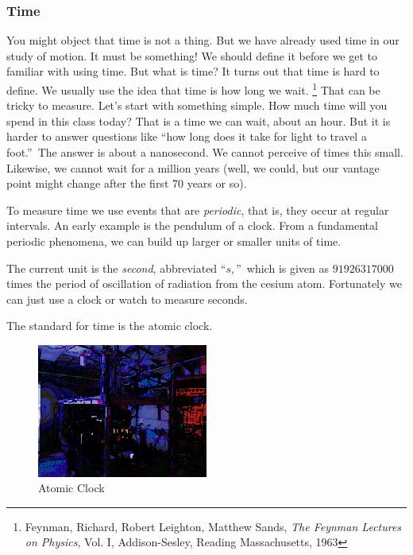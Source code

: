 \documentclass[]{Book}
\begin{document}
\subsubsection{Time}

You might object that time is not a thing. But we have already used time in
our study of motion. It must be something! We should define it before we get
to familiar with using time. But what is time? It turns out that time is
hard to define. We usually use the idea that time is how long we wait.%
\footnote{%
	Feynman, Richard, Robert Leighton, Matthew Sands, \emph{The Feynman Lectures
		on Physics}, Vol. I, Addison-Sesley, Reading Massachusetts, 1963} That can
be tricky to measure. Let's start with something simple. How much time will
you spend in this class today? That is a time we can wait, about an hour.
But it is harder to answer questions like \textquotedblleft how long does it
take for light to travel a foot.\textquotedblright\ The answer is about a
nanosecond. We cannot perceive of times this small. Likewise, we cannot wait
for a million years (well, we could, but our vantage point might change
after the first 70 years or so).

To measure time we use events that are \emph{periodic}, that is, they occur
at regular intervals. An early example is the pendulum of a clock. From a
fundamental periodic phenomena, we can build up larger or smaller units of
time.

The current unit is the \emph{second}, abbreviated \textquotedblleft $\unit{s%
},$\textquotedblright\ which is given as $91926317000$ times the period of
oscillation of radiation from the cesium atom. Fortunately we can just use a
clock or watch to measure seconds.

The standard for time is the atomic clock.



	\begin{figure}[h]
		\centering
		\includegraphics[width=0.5\textwidth]{Atomic_Clock}
		\caption{Atomic Clock}
		\label{fig:AtomicClock}
	\end{figure}
\end{document}
